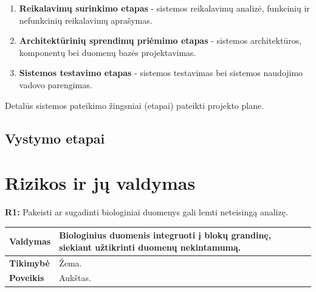 \documentclass[12pt]{article}
\begin{document}
\begin{enumerate}
    \item \textbf{Reikalavimų surinkimo etapas} - sistemos reikalavimų analizė,
    funkcinių ir nefunkcinių reikalavimų aprašymas.
    \item \textbf{Architektūrinių sprendimų priėmimo etapas} - sistemos
    architektūros, komponentų bei duomenų bazės projektavimas.
    \item \textbf{Sistemos testavimo etapas} - sistemos testavimas bei sistemos
    naudojimo vadovo parengimas.
\end{enumerate}

Detalūs sistemos pateikimo žingsniai (etapai) pateikti projekto plane.

\subsection{Vystymo etapai}

\newpage

\section{Rizikos ir jų valdymas}
\noindent \textbf{R1:} Pakeisti ar sugadinti biologiniai duomenys gali lemti
neteisingą analizę.

\label{sec:R1}
\begin{table}[htb!]
    \captionsetup{justification=centering}
    \vskip -10pt
    \begin{tabular}{|m{3cm}|m{13.7cm}|}
        \hline
        \raggedleft \textbf{\cellcolor{deepchampagne}Valdymas} &
        Biologinius duomenis integruoti į blokų grandinę, siekiant užtikrinti
        duomenų nekintamumą. \\
        \hline
        \raggedleft \textbf{\cellcolor{deepchampagne}Tikimybė} & Žema. \\
        \hline
        \raggedleft \textbf{\cellcolor{deepchampagne}Poveikis} & Aukštas. \\
        \hline
    \end{tabular}
\end{table}
\end{document}
